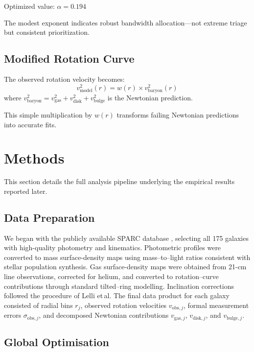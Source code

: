 \documentclass[twocolumn,prd,amsmath,amssymb,aps,superscriptaddress,nofootinbib]{revtex4-2}
\begin{document}
Optimized value: $\alpha = 0.194$

The modest exponent indicates robust bandwidth allocation---not extreme triage but consistent prioritization.

\subsection{Modified Rotation Curve}

The observed rotation velocity becomes:
\begin{equation}
v_{\text{model}}^2(r) = w(r) \times v_{\text{baryon}}^2(r)
\end{equation}
where $v_{\text{baryon}}^2 = v_{\text{gas}}^2 + v_{\text{disk}}^2 + v_{\text{bulge}}^2$ is the Newtonian prediction.

This simple multiplication by $w(r)$ transforms failing Newtonian predictions into accurate fits.

\section{Methods}
\label{sec:methods}

This section details the full analysis pipeline underlying the empirical results reported later.

\subsection{Data Preparation}

We began with the publicly available SPARC database \cite{Lelli2016}, selecting all 175 galaxies with high-quality photometry and kinematics. Photometric profiles were converted to mass surface-density maps using mass–to–light ratios consistent with stellar population synthesis. Gas surface-density maps were obtained from 21-cm line observations, corrected for helium, and converted to rotation–curve contributions through standard tilted–ring modelling. Inclination corrections followed the procedure of Lelli et\,al. The final data product for each galaxy consisted of radial bins $r_j$, observed rotation velocities $v_{\text{obs},j}$, formal measurement errors $\sigma_{\text{obs},j}$, and decomposed Newtonian contributions $v_{\text{gas},j}$, $v_{\text{disk},j}$, and $v_{\text{bulge},j}$.

\subsection{Global Optimisation}
\end{document}
